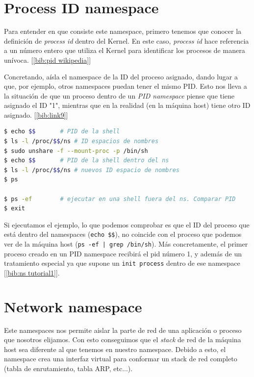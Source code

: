 \documentclass[a4paper, oneside, 12pt]{book}
\begin{document}
	\pagebreak
	
	\section{Process ID namespace}
	\par \noindent Para entender en que consiste este namespace, primero tenemos que conocer la definición de \textit{process id} dentro del Kernel. En este caso, \textit{process id} hace referencia a un número entero que utiliza el Kernel para identificar los procesos de manera unívoca. [\ref{bib:pid wikipedia}] \\
	
	\par \noindent Concretando, aísla el namespace de la ID del proceso asignado, dando lugar a que, por ejemplo, otros namespaces puedan tener el mismo PID. Esto nos lleva a la situación de que un proceso dentro de un \textit{PID namespace} piense que tiene asignado el ID "1", mientras que en la realidad (en la máquina host) tiene otro ID asignado. [\ref{bib:link9}]
	
	\addvspace{10px}
	
	\begin{lstlisting}[language=bash, caption=Uso de process id namespace]
$ echo $$		# PID de la shell
$ ls -l /proc/$$/ns	# ID espacios de nombres 
$ sudo unshare -f --mount-proc -p /bin/sh
$ echo $$		# PID de la shell dentro del ns
$ ls -l /proc/$$/ns	# nuevos ID espacio de nombres
$ ps

$ ps -ef 		# ejecutar en una shell fuera del ns. Comparar PID
$ exit
	\end{lstlisting}

	\addvspace{10px}
	
	\par \noindent Si ejecutamos el ejemplo, lo que podemos comprobar es que el ID del proceso que está dentro del namespaces (\texttt{echo \$\$}), no coincide con el proceso que podemos ver de la máquina host (\texttt{ps -ef | grep /bin/sh}). Más concretamente, el primer proceso creado en un PID namespace recibirá el pid número 1, y además de un tratamiento especial ya que supone  un \texttt{init process} dentro de ese namespace [\ref{bib:ns tutorial1}].
	
	
	\pagebreak
	
	\section{Network namespace}
	\par \noindent Este namespaces nos permite aislar la parte de red de una aplicación o proceso que nosotros elijamos. Con esto conseguimos que el \textit{stack} de red de la máquina host sea diferente al que tenemos en nuestro namespace. Debido a esto, el namespace crea una interfaz virtual para conformar un stack de red completo (tabla de enrutamiento, tabla ARP, etc...).\\
	
\end{document}

